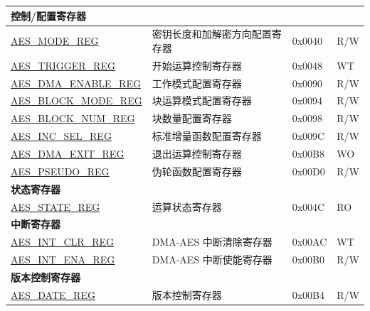 \begin{longtable}{ | p{5.2cm} | p{6.6cm} | p{2cm} | p{1.2cm} | }
\multicolumn{4}{|l|}{\textbf{控制/配置寄存器}} \\ \hline

\hyperref[regdesc:AESMODEREG]{AES\_MODE\_REG} & 密钥长度和加解密方向配置寄存器 & 0x0040 & R/W \\ \hline
\hyperref[regdesc:AESTRIGGERREG]{AES\_TRIGGER\_REG} & 开始运算控制寄存器 & 0x0048 & WT \\ \hline
\hyperref[regdesc:AESDMAENABLEREG]{AES\_DMA\_ENABLE\_REG}	&	工作模式配置寄存器 & 0x0090 & R/W \\ \hline
\hyperref[regdesc:AESBLOCKMODEREG]{AES\_BLOCK\_MODE\_REG}	& 块运算模式配置寄存器 & 0x0094 & R/W \\ \hline
\hyperref[regdesc:AESBLOCKNUMREG]{AES\_BLOCK\_NUM\_REG} & 块数量配置寄存器 & 0x0098 & R/W \\ \hline
\hyperref[regdesc:AESINCSELREG]{AES\_INC\_SEL\_REG} &	标准增量函数配置寄存器 & 0x009C & R/W \\ \hline
\hyperref[regdesc:AESDMAEXITREG]{AES\_DMA\_EXIT\_REG}	&	退出运算控制寄存器	& 0x00B8 & WO \\ \hline
\hyperref[regdesc:AESPSEUDOREG]{AES\_PSEUDO\_REG} & 伪轮函数配置寄存器 & 0x00D0 & R/W \\ \hline

\multicolumn{4}{|l|}{\textbf{状态寄存器}} \\ \hline

\hyperref[regdesc:AESSTATEREG]{AES\_STATE\_REG}				&	运算状态寄存器			& 0x004C & RO \\ \hline

\multicolumn{4}{|l|}{\textbf{中断寄存器}} \\ \hline

\hyperref[regdesc:AESINTCLRREG]{AES\_INT\_CLR\_REG}			&	DMA-AES 中断清除寄存器	& 0x00AC & WT \\ \hline
\hyperref[regdesc:AESINTENAREG]{AES\_INT\_ENA\_REG}			&	DMA-AES 中断使能寄存器	& 0x00B0 & R/W \\ \hline

\multicolumn{4}{|l|}{\textbf{版本控制寄存器}} \\ \hline
\hyperref[regdesc:AESDATEREG]{AES\_DATE\_REG} & 版本控制寄存器 & 0x00B4 & R/W \\ \hline

\end{longtable}
